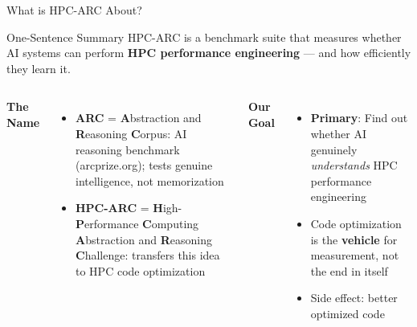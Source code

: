 \documentclass[compress,aspectratio=169]{beamer}
\title{\mytitle}
\subtitle{\mysubtitle}
\author{\myauthor}
\institute{\myinstitute}
\date{\mydate}
\begin{document}
\begin{frame}
    \titlepage
\end{frame}

\begin{frame}{What is HPC-ARC About?}

    \vspace{-0.3em}
    \begin{block}{One-Sentence Summary}
        \scriptsize
        HPC-ARC is a benchmark suite that measures whether AI systems can perform \textbf{HPC performance engineering} --- and how efficiently they learn it.
    \end{block}

    \begin{columns}[t]
            \textbf{The Name}
            \vspace{0.2em}
            \scriptsize
            \begin{itemize}
                \item \textbf{ARC} = \textbf{A}bstraction and \textbf{R}easoning \textbf{C}orpus: AI reasoning benchmark (arcprize.org); tests genuine intelligence, not memorization
                \item \textbf{HPC-ARC} = \textbf{H}igh-\textbf{P}erformance \textbf{C}omputing \textbf{A}bstraction and \textbf{R}easoning \textbf{C}hallenge: transfers this idea to HPC code optimization
            \end{itemize}

            \vspace{0.4em}
            \textbf{Our Goal}
            \vspace{0.2em}
            \scriptsize
            \begin{itemize}
                \item \textbf{Primary}: Find out whether AI genuinely \textit{understands} HPC performance engineering
                \item Code optimization is the \textbf{vehicle} for measurement, not the end in itself
                \item Side effect: better optimized code
            \end{itemize}


\end{columns}
\end{frame}
\end{document}

